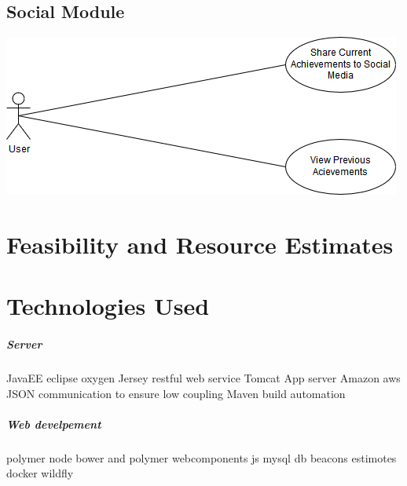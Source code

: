 \documentclass[11pt]{article}
\begin{document}
\subsection{Social Module}
\includegraphics[width=0.7\linewidth]{Social.png}\\[1cm]

\section{Feasibility and Resource Estimates}

\section{Technologies Used}
\subparagraph{Server}
JavaEE eclipse oxygen 
Jersey restful web service
Tomcat App server
Amazon aws
JSON communication to ensure low coupling
Maven build automation 
\subparagraph{Web develpement}
polymer
node bower and polymer
webcomponents
js
mysql db
beacons estimotes
docker
wildfly
\end{document}
